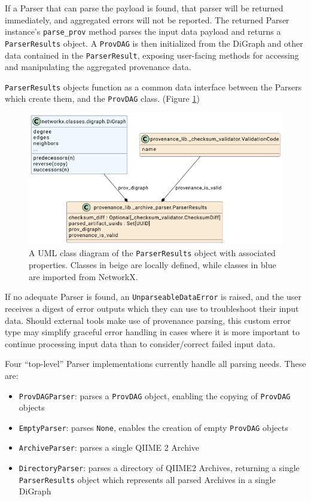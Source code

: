 If a Parser that can parse the payload is found, that parser will be returned
immediately, and aggregated errors will not be reported. The returned Parser
instance’s \texttt{parse\_prov} method parses the input data payload and returns a
\texttt{ParserResults} object. A \texttt{ProvDAG} is then initialized from the DiGraph and other
data contained in the \texttt{ParserResult}, exposing user-facing methods for accessing
and manipulating the aggregated provenance data.

\texttt{ParserResults} objects function as a common data interface between the Parsers
which create them, and the \texttt{ProvDAG} class. (Figure \ref{fig:ParserResultsUML})

\begin{figure}[htp]
\centering
\includegraphics[width=\textwidth]{figures/ParserResultsUML.png}
\caption[UML Class diagram of the ParserResults class and its components]%
{A UML class diagram of the \texttt{ParserResults} object with associated properties.
Classes in beige are locally defined, while classes in blue are imported from
NetworkX.}
\label{fig:ParserResultsUML}
\end{figure}

If no adequate Parser is found, an \texttt{UnparseableDataError} is raised, and the user
receives a digest of error outputs which they can use to troubleshoot their
input data. Should external tools make use of provenance parsing, this custom
error type may simplify graceful error handling in cases where it is more
important to continue processing input data than to consider/correct failed
input data. 

Four “top-level” Parser implementations currently handle all parsing needs.
These are:
\begin{itemize}
    \item \texttt{ProvDAGParser}: parses a \texttt{ProvDAG} object, enabling the copying of \texttt{ProvDAG} objects
    \item \texttt{EmptyParser}: parses \texttt{None}, enables the creation of empty \texttt{ProvDAG} objects
    \item \texttt{ArchiveParser}: parses a single QIIME 2 Archive
    \item \texttt{DirectoryParser}: parses a directory of QIIME2 Archives, returning a single \texttt{ParserResults} object which represents all parsed Archives in a single DiGraph
\end{itemize}

